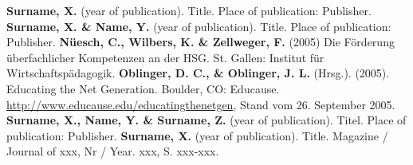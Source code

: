 \begin{thebibliography}{1}
 \textbf{Surname, X.} (year of publication). Title. Place of publication: Publisher.
 \textbf{Surname, X. \& Name, Y.} (year of publication). Title. Place of publication: Publisher.
 \textbf{Nüesch, C., Wilbers, K. \& Zellweger, F.} (2005) Die Förderung überfachlicher Kompetenzen an der
HSG. St. Gallen: Institut für Wirtschaftspädagogik.
 \textbf{Oblinger, D. C., \& Oblinger, J. L.} (Hrsg.). (2005). Educating the Net Generation. Boulder, CO:
Educause. \url{http://www.educause.edu/educatingthenetgen}, Stand vom 26. September 2005.
 \textbf{Surname, X., Name, Y. \& Surname, Z.} (year of publication). Titel. Place of publication: Publisher.
 \textbf{Surname, X.} (year of publication). Title. Magazine / Journal of xxx, Nr / Year. xxx, S. xxx-xxx.
\end{thebibliography}